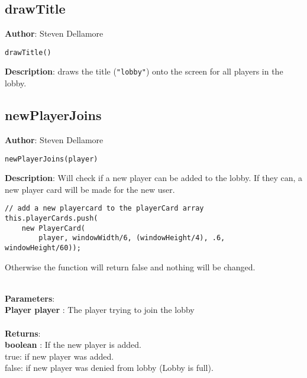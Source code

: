 \documentclass[12pt]{article}
\begin{document}
\subsection{drawTitle}
\textbf{Author}: Steven Dellamore 
\vspace*{1\baselineskip}
\begin{lstlisting}
drawTitle()
\end{lstlisting} 
\vspace*{1\baselineskip}
\textbf{Description}: draws the title (\texttt{"lobby"}) onto the screen for all players in the lobby. 



\subsection{newPlayerJoins}
\textbf{Author}: Steven Dellamore 
\vspace*{1\baselineskip}
\begin{lstlisting}
newPlayerJoins(player)
\end{lstlisting} 
\vspace*{1\baselineskip}
\textbf{Description}: Will check if a new player can be added to the lobby. If they can, a new player card will be made for the new user. 
\begin{verbatim}
// add a new playercard to the playerCard array
this.playerCards.push(
    new PlayerCard(
        player, windowWidth/6, (windowHeight/4), .6, windowHeight/60));
\end{verbatim}
 Otherwise the function will return false and nothing will be changed. 


\textbf{\large{\\Parameters}}:\\
\textbf{Player player }: The player trying to join the lobby\\\textbf{\large{\\Returns}}:\\
\textbf{boolean }: If the new player is added. \\ true: if new player was added. \\ false: if new player was denied from lobby (Lobby is full).\\
\end{document}
